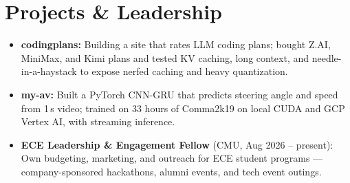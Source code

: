 \documentclass[11pt, letterpaper]{article}
\begin{document}
\section{Projects \& Leadership}
\begin{itemize}
  \item \textbf{codingplans:} Building a site that rates LLM coding plans; bought Z.AI, MiniMax, and Kimi plans and tested KV caching, long context, and needle-in-a-haystack to expose nerfed caching and heavy quantization.
  \item \textbf{my-av:} Built a PyTorch CNN-GRU that predicts steering angle and speed from 1\,s video; trained on 33 hours of Comma2k19 on local CUDA and GCP Vertex AI, with streaming inference.
  \item \textbf{ECE Leadership \& Engagement Fellow} (CMU, Aug 2026 -- present): Own budgeting, marketing, and outreach for ECE student programs --- company-sponsored hackathons, alumni events, and tech event outings.
\end{itemize}
\end{document}
